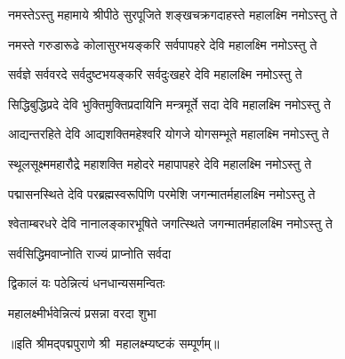 
\twolineshloka
{नमस्तेऽस्तु महामाये श्रीपीठे सुरपूजिते}
{शङ्खचक्रगदाहस्ते महालक्ष्मि नमोऽस्तु ते}

\twolineshloka
{नमस्ते गरुडारूढे कोलासुरभयङ्करि}
{सर्वपापहरे देवि महालक्ष्मि नमोऽस्तु ते}

\twolineshloka
{सर्वज्ञे सर्ववरदे सर्वदुष्टभयङ्करि}
{सर्वदुःखहरे देवि महालक्ष्मि नमोऽस्तु ते}

\twolineshloka
{सिद्धिबुद्धिप्रदे देवि भुक्तिमुक्तिप्रदायिनि}
{मन्त्रमूर्ते सदा देवि महालक्ष्मि नमोऽस्तु ते}

\twolineshloka
{आद्यन्तरहिते देवि आद्यशक्तिमहेश्वरि}
{योगजे योगसम्भूते महालक्ष्मि नमोऽस्तु ते}

\twolineshloka
{स्थूलसूक्ष्ममहारौद्रे महाशक्ति महोदरे}
{महापापहरे देवि महालक्ष्मि नमोऽस्तु ते}

\twolineshloka
{पद्मासनस्थिते देवि परब्रह्मस्वरूपिणि}
{परमेशि जगन्मातर्महालक्ष्मि नमोऽस्तु ते}

\twolineshloka
{श्वेताम्बरधरे देवि नानालङ्कारभूषिते}
{जगत्स्थिते जगन्मातर्महालक्ष्मि नमोऽस्तु ते}

{सर्वसिद्धिमवाप्नोति राज्यं प्राप्नोति सर्वदा}

{द्विकालं यः पठेन्नित्यं धनधान्यसमन्वितः}

{महालक्ष्मीर्भवेन्नित्यं प्रसन्ना वरदा शुभा}

॥इति श्रीमद्पद्मपुराणे श्री~महालक्ष्म्यष्टकं सम्पूर्णम्॥